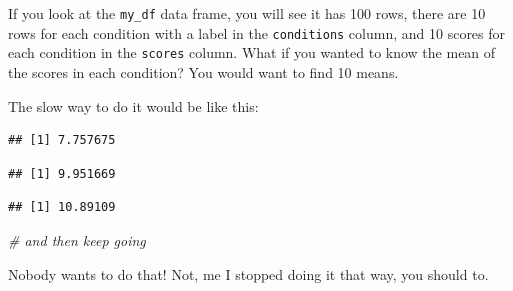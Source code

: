 \documentclass[
]{book}
\newenvironment{Shaded}{\begin{snugshade}}{\end{snugshade}}
\newcommand{\CommentTok}[1]{\textcolor[rgb]{0.56,0.35,0.01}{\textit{#1}}}
\newcommand{\FunctionTok}[1]{\textcolor[rgb]{0.00,0.00,0.00}{#1}}
\newcommand{\NormalTok}[1]{#1}
\newcommand{\SpecialCharTok}[1]{\textcolor[rgb]{0.00,0.00,0.00}{#1}}
\newcommand{\StringTok}[1]{\textcolor[rgb]{0.31,0.60,0.02}{#1}}
\begin{document}
If you look at the \texttt{my\_df} data frame, you will see it has 100 rows, there are 10 rows for each condition with a label in the \texttt{conditions} column, and 10 scores for each condition in the \texttt{scores} column. What if you wanted to know the mean of the scores in each condition? You would want to find 10 means.

The slow way to do it would be like this:

\begin{Shaded}
\end{Shaded}

\begin{verbatim}
## [1] 7.757675
\end{verbatim}

\begin{Shaded}
\end{Shaded}

\begin{verbatim}
## [1] 9.951669
\end{verbatim}

\begin{Shaded}
\end{Shaded}

\begin{verbatim}
## [1] 10.89109
\end{verbatim}

\begin{Shaded}
\begin{Highlighting}[]
\CommentTok{\# and then keep going}
\end{Highlighting}
\end{Shaded}

Nobody wants to do that! Not, me I stopped doing it that way, you should to.
\end{document}
